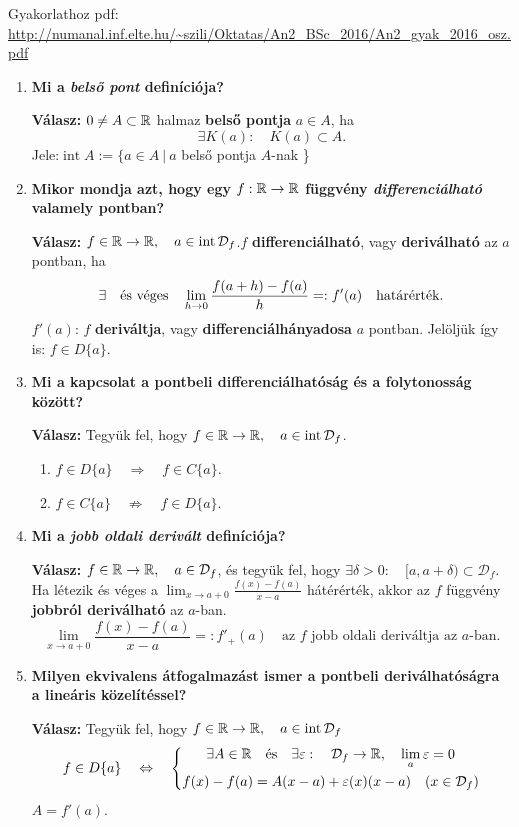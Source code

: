 \documentclass[a4paper,11.5pt]{article}
\DeclareMathOperator{\Int}{int}
\begin{document}
	Gyakorlathoz pdf: \url{http://numanal.inf.elte.hu/~szili/Oktatas/An2_BSc_2016/An2_gyak_2016_osz.pdf}
	\begin{enumerate}
		\item \textbf{Mi a \textit{belső pont} definíciója?}
		
		\textbf{Válasz:} 
		$0\not=A\subset \mathbb{R}$ halmaz \textbf{belső pontja} $a\in A$, ha
		\[  \exists K(a):\quad K(a)\subset A. \]
		Jele:\quad $\Int A:=\{ a\in A\ | \ a $ belső pontja $A$-nak \}
		\item \textbf{Mikor mondja azt, hogy egy $f:\mathbb{R}\to\mathbb{R}$ függvény \textit{differenciálható} valamely pontban?}	
		
		\textbf{Válasz:}
		$f\in\R\to\R, \quad a\in\Int\mathcal{D}_f$.\quad  $f$ \textbf{differenciálható}, vagy \textbf{deriválható} az $a$ pontban, ha
		\[ \exists\text{\quad és véges\quad }\lim_{h\to0}\frac{f(a+h)-f(a)}{h}=:f'(a)\quad \text{határérték.} \]
		$f'(a)$: $f$ \textbf{deriváltja}, vagy \textbf{differenciálhányadosa} $a$ pontban.
		Jelöljük így is: $f\in D\{a\}$.
		\item \textbf{Mi a kapcsolat a pontbeli differenciálhatóság és a folytonosság között?}
		
		\textbf{Válasz:} Tegyük fel, hogy $f\in\R\to\R, \quad a\in\Int\mathcal{D}_f$.
		\begin{enumerate}
			\item $f\in D\{a\}\quad \Rightarrow \quad f\in C\{a\}$.
			\item $f\in C\{a\}\quad \not\Rightarrow \quad f\in D\{a\}$.
		\end{enumerate}
		
		\item\textbf{Mi a \textit{jobb oldali derivált} definíciója?}
		
		\textbf{Válasz:} $f\in\mathbb{R}\to\mathbb{R},\quad a\in\mathcal{D}_f$, és tegyük fel, hogy $\exists\delta>0:\quad [a,a+\delta)\subset\mathcal{D}_f.$ Ha létezik és véges a $\displaystyle \lim_{x\to a+0}\frac{f(x)-f(a)}{x-a}$ hátérérték, akkor az $f$ függvény \textbf{jobbról deriválható} az $a$-ban.
		\[\displaystyle \lim_{x\to a+0}\frac{f(x)-f(a)}{x-a} =:f'_+(a) \quad \text{az $f$ jobb oldali deriváltja az $a$-ban.} \]
		
		\item\textbf{Milyen ekvivalens átfogalmazást ismer a pontbeli deriválhatóságra a lineáris közelítéssel?}
		
		\textbf{Válasz:}
		Tegyük fel, hogy $f\in\R\to\R,\quad a\in\Int\mathcal{D}_f$
		\[ f\in D\{a\}\quad \Leftrightarrow\quad 
		\left\{\begin{gathered}
		\exists A\in\mathbb{R}\quad \text{és}\quad \exists \varepsilon:\quad \mathcal{D}_f\to\mathbb{R},\quad \lim_a\varepsilon=0\\
		f(x)-f(a)=A(x-a)+\varepsilon(x)(x-a)\quad (x\in\mathcal{D}_f)
		\end{gathered}\right. \]
		$A=f'(a)$.
		

\end{enumerate}
\end{document}
